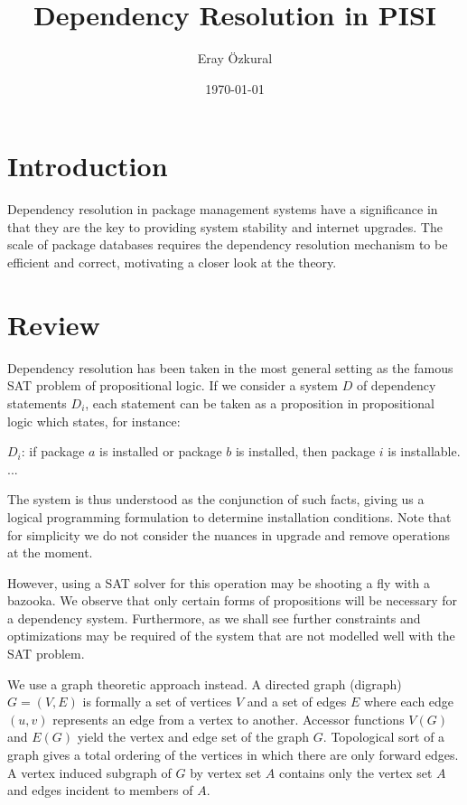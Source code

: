 \documentclass[a4paper,11pt]{article}
\title{ Dependency Resolution in PISI}
\author{Eray \"{O}zkural}
\date{\today}
\begin{document}
\maketitle

\section{Introduction}

Dependency resolution in package management systems have a
significance in that they are the key to providing system stability
and internet upgrades. The scale of package databases requires the
dependency resolution mechanism to be efficient and correct,
motivating a closer look at the theory.


\section{Review}

Dependency resolution has been taken in the most general setting as
the famous SAT problem of propositional logic. If we consider a system
$D$ of dependency statements $D_i$, each statement can be taken as a
proposition in propositional logic which states, for instance:

$D_i$: if package $a$ is installed or package $b$ is installed, then
package $i$ is installable.\\
...

The system is thus understood as the conjunction of such facts, giving
us a logical programming formulation to determine installation
conditions. Note that for simplicity we do not consider the nuances in
upgrade and remove operations at the moment.

However, using a SAT solver for this operation may be shooting a fly
with a bazooka. We observe that only certain forms of propositions
will be necessary for a dependency system. Furthermore, as we shall
see further constraints and optimizations may be required of the
system that are not modelled well with the SAT problem.

We use a graph theoretic approach instead. A directed graph (digraph)
$G=(V,E)$ is formally a set of vertices $V$ and a set of edges $E$
where each edge $(u,v)$ represents an edge from a vertex to another.
Accessor functions $V(G)$ and $E(G)$ yield the vertex and edge set of
the graph $G$. Topological sort of a graph gives a total ordering of
the vertices in which there are only forward edges. A vertex induced
subgraph of $G$ by vertex set $A$ contains only the vertex set $A$ and
edges incident to members of $A$.
\end{document}
